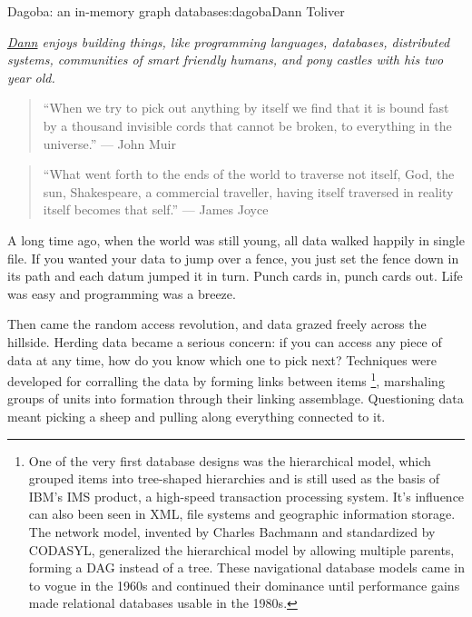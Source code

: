 \begin{aosachapter}{Dagoba: an in-memory graph database}{s:dagoba}{Dann Toliver}

\emph{\href{https://twitter.com/dann}{Dann} enjoys building things, like
programming languages, databases, distributed systems, communities of
smart friendly humans, and pony castles with his two year old.}

\label{prologue}

\begin{quote}
``When we try to pick out anything by itself we find that it is bound
fast by a thousand invisible cords that cannot be broken, to everything
in the universe.'' --- John Muir
\end{quote}

\begin{quote}
``What went forth to the ends of the world to traverse not itself, God,
the sun, Shakespeare, a commercial traveller, having itself traversed in
reality itself becomes that self.'' --- James Joyce
\end{quote}

A long time ago, when the world was still young, all data walked happily
in single file. If you wanted your data to jump over a fence, you just
set the fence down in its path and each datum jumped it in turn. Punch
cards in, punch cards out. Life was easy and programming was a breeze.

Then came the random access revolution, and data grazed freely across
the hillside. Herding data became a serious concern: if you can access
any piece of data at any time, how do you know which one to pick next?
Techniques were developed for corralling the data by forming links
between items \footnote{One of the very first database designs was the
  hierarchical model, which grouped items into tree-shaped hierarchies
  and is still used as the basis of IBM's IMS product, a high-speed
  transaction processing system. It's influence can also been seen in
  XML, file systems and geographic information storage. The network
  model, invented by Charles Bachmann and standardized by CODASYL,
  generalized the hierarchical model by allowing multiple parents,
  forming a DAG instead of a tree. These navigational database models
  came in to vogue in the 1960s and continued their dominance until
  performance gains made relational databases usable in the 1980s.},
marshaling groups of units into formation through their linking
assemblage. Questioning data meant picking a sheep and pulling along
everything connected to it.


\end{aosachapter}
